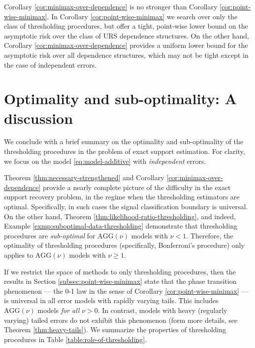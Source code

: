 \begin{remark}
Corollary \ref{cor:minimax-over-dependence} is no stronger than Corollary \ref{cor:point-wise-minimax}. 
In Corollary \ref{cor:point-wise-minimax} we search over only the class of thresholding procedures, but offer a tight, point-wise lower bound on the asymptotic risk over the class of URS dependence structures.
On the other hand, Corollary \ref{cor:minimax-over-dependence} provides a uniform lower bound for the asymptotic risk over all dependence structures, which may not be tight except in the case of independent errors.
\end{remark}




\section{Optimality and sub-optimality: A discussion}

We conclude with a brief summary on the optimality and sub-optimality of the thresholding procedures in the problem of exact support estimation.
For clarity, we focus on the model \eqref{eq:model-additive} with {\em independent} errors. 

Theorem \ref{thm:necessary-strengthened} and Corollary \ref{cor:minimax-over-dependence} provide a nearly complete picture of the difficulty 
in the exact support  recovery problem, in the regime when the thresholding estimators are optimal. Specifically, in such cases the signal classification boundary is universal.  On the other hand, Theorem \ref{thm:likelihood-ratio-thresholding}, and indeed, Example \ref{exmp:suboptimal-data-thresholding} demonstrate that thresholding procedures are \emph{sub-optimal} for $\text{AGG}(\nu)$ models with $\nu<1$. Therefore, the optimality of thresholding
procedures (specifically, Bonferroni's procedure) only applies to $\text{AGG}(\nu)$ models with $\nu\ge1$. 

If we restrict the space of methods to only thresholding procedures, then the results in Section \ref{subsec:point-wise-minimax} state that the phase 
transition phenomenon --- the 0-1 law in the sense of Corollary \ref{cor:point-wise-minimax} --- is universal in all error models with rapidly varying tails.
This includes $\text{AGG}(\nu)$ models {\it for all} $\nu>0$.  In contrast, models with heavy (regularly varying) tailed errors do not exhibit this phenomenon 
(form more details, see Theorem \ref{thm:heavy-tails}).  We summarize the properties of thresholding procedures in 
Table \ref{table:role-of-thresholding}. 

